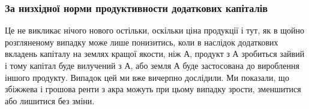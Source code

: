 \subsubsection{За низхідної норми продуктивности додаткових капіталів}

Це не викликає нічого нового остільки, оскільки ціна продукції і тут, як
в щойно розгляненому випадку може лише понизитись, коли в наслідок додаткових
вкладень капіталу на землях кращої якости, ніж А, продукт з А зробиться
зайвий і тому капітал буде вилучений з А, або земля А буде застосована до вироблення
іншого продукту. Випадок цей ми вже вичерпно дослідили. Ми показали,
що збіжжева і грошова ренти з акра можуть при цьому випадку зрости,
зменшитися або лишитися без зміни.
